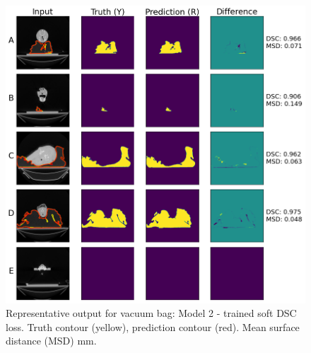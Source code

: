 \begin{figure}[H]
	\begin{center}
		\includegraphics[width=1.0\textwidth]{figures/vet_vacbag}
		\caption{Representative output for vacuum bag: Model 2 - trained soft DSC loss. Truth contour (yellow), prediction contour (red). Mean surface distance (MSD) mm.}
		\label{fig:vet_vacbag}
	\end{center}
\end{figure}

